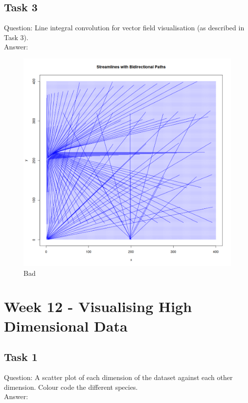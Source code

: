 \documentclass[12pt,a4paper]{report}
\begin{document}
\subsection{Task 3}
Question: Line integral convolution for vector field visualisation (as described in Task 3).
\\
Answer: 
\begin{figure}[H]
\centering
\includegraphics[width=\textwidth]{../Code/week 10/task3.png} 
\caption{Bad}
\end{figure}


\section{Week 12 - Visualising High Dimensional Data}
\subsection{Task 1}
Question: A scatter plot of each dimension of the dataset against each other dimension. Colour
code the different species.
\\
Answer: 
\end{document}
